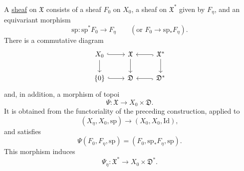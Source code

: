 A \underline{sheaf} on $\mathfrak X$ consists of a sheaf $F_0$ on
$X_0$, a sheaf on $\mathfrak X^*$ given by $F_\eta$, and an equivariant
morphism
\[
\mathrm{sp}:\mathrm{sp}^*F_0\longrightarrow F_\eta
\qquad
(\text{or }F_0\longrightarrow\mathrm{sp}_*F_\eta).
\]
There is a commutative diagram
\[
\begin{tikzcd}
X_0 \arrow[r, hook] \arrow[d]
  & \mathfrak X \arrow[d]
  & \mathfrak X^* \arrow[l, hook] \arrow[d] \\
\{0\} \arrow[r, hook]
  & \mathfrak D
  & \mathfrak D^* \arrow[l, hook]
\end{tikzcd}
\]
and, in addition, a morphism of topoi
\[
\Psi:\mathfrak X\longrightarrow X_0\times\mathfrak D.
\]
It is obtained from the functoriality of the preceding construction,
applied to
\[
(X_\eta,X_0,\mathrm{sp})
\longrightarrow(X_0,X_0,\mathrm{Id}),
\]
and satisfies
\[
\Psi(F_0,F_\eta,\mathrm{sp})
=(F_0,\mathrm{sp}_*F_\eta,\mathrm{sp}).
\]
This morphism induces
\[
\Psi_\eta:\mathfrak X^*\longrightarrow X_0\times\mathfrak D^*.
\]

